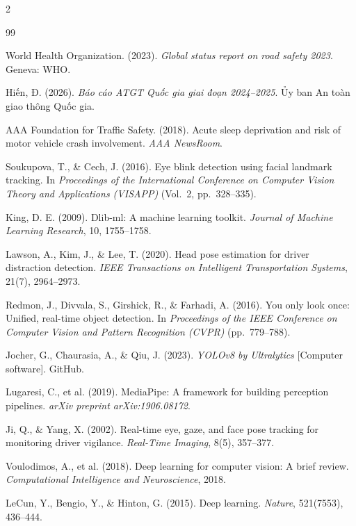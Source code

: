 \documentclass[10pt]{article}
\begin{document}
\begin{multicols}{2}
\begin{thebibliography}{99}
\fontsize{9}{11}\selectfont
\raggedright
\color{jsttcite}

 World Health Organization. (2023). \textit{Global status report on road safety 2023}. Geneva: WHO.

 Hiến, Đ. (2026). \textit{Báo cáo ATGT Quốc gia giai đoạn 2024--2025}. Ủy ban An toàn giao thông Quốc gia.

 AAA Foundation for Traffic Safety. (2018). Acute sleep deprivation and risk of motor vehicle crash involvement. \textit{AAA NewsRoom}.

 Soukupova, T., \& Cech, J. (2016). Eye blink detection using facial landmark tracking. In \textit{Proceedings of the International Conference on Computer Vision Theory and Applications (VISAPP)} (Vol.~2, pp.~328--335).

 King, D. E. (2009). Dlib-ml: A machine learning toolkit. \textit{Journal of Machine Learning Research}, 10, 1755--1758.

 Lawson, A., Kim, J., \& Lee, T. (2020). Head pose estimation for driver distraction detection. \textit{IEEE Transactions on Intelligent Transportation Systems}, 21(7), 2964--2973.

 Redmon, J., Divvala, S., Girshick, R., \& Farhadi, A. (2016). You only look once: Unified, real-time object detection. In \textit{Proceedings of the IEEE Conference on Computer Vision and Pattern Recognition (CVPR)} (pp.~779--788).

 Jocher, G., Chaurasia, A., \& Qiu, J. (2023). \textit{YOLOv8 by Ultralytics} [Computer software]. GitHub.

 Lugaresi, C., et al. (2019). MediaPipe: A framework for building perception pipelines. \textit{arXiv preprint arXiv:1906.08172}.

 Ji, Q., \& Yang, X. (2002). Real-time eye, gaze, and face pose tracking for monitoring driver vigilance. \textit{Real-Time Imaging}, 8(5), 357--377.

 Voulodimos, A., et al. (2018). Deep learning for computer vision: A brief review. \textit{Computational Intelligence and Neuroscience}, 2018.

 LeCun, Y., Bengio, Y., \& Hinton, G. (2015). Deep learning. \textit{Nature}, 521(7553), 436--444.


\end{thebibliography}
\end{multicols}
\end{document}
